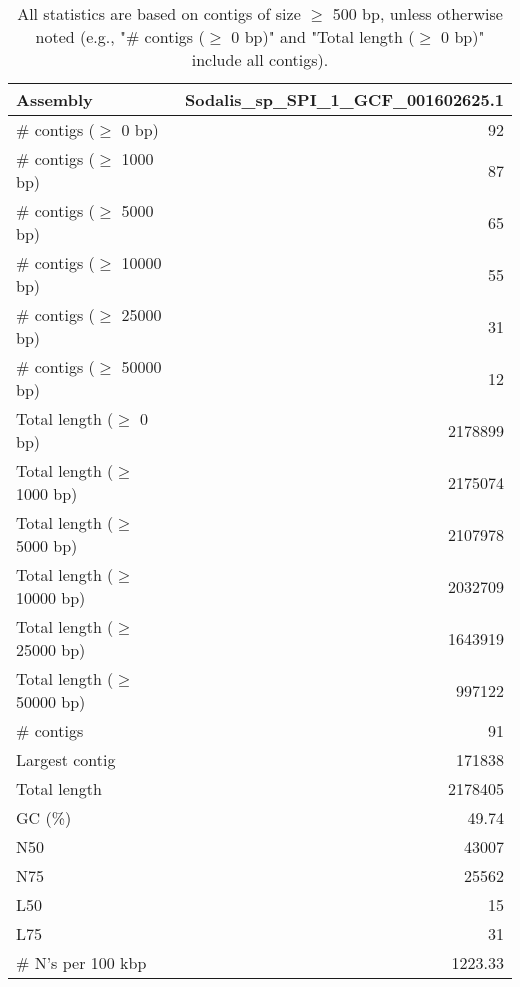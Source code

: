 \documentclass[12pt,a4paper]{article}
\begin{document}
\begin{table}[ht]
\begin{center}
\caption{All statistics are based on contigs of size $\geq$ 500 bp, unless otherwise noted (e.g., "\# contigs ($\geq$ 0 bp)" and "Total length ($\geq$ 0 bp)" include all contigs).}
\begin{tabular}{|l*{1}{|r}|}
\hline
Assembly & Sodalis\_sp\_SPI\_1\_GCF\_001602625.1 \\ \hline
\# contigs ($\geq$ 0 bp) & 92 \\ \hline
\# contigs ($\geq$ 1000 bp) & 87 \\ \hline
\# contigs ($\geq$ 5000 bp) & 65 \\ \hline
\# contigs ($\geq$ 10000 bp) & 55 \\ \hline
\# contigs ($\geq$ 25000 bp) & 31 \\ \hline
\# contigs ($\geq$ 50000 bp) & 12 \\ \hline
Total length ($\geq$ 0 bp) & 2178899 \\ \hline
Total length ($\geq$ 1000 bp) & 2175074 \\ \hline
Total length ($\geq$ 5000 bp) & 2107978 \\ \hline
Total length ($\geq$ 10000 bp) & 2032709 \\ \hline
Total length ($\geq$ 25000 bp) & 1643919 \\ \hline
Total length ($\geq$ 50000 bp) & 997122 \\ \hline
\# contigs & 91 \\ \hline
Largest contig & 171838 \\ \hline
Total length & 2178405 \\ \hline
GC (\%) & 49.74 \\ \hline
N50 & 43007 \\ \hline
N75 & 25562 \\ \hline
L50 & 15 \\ \hline
L75 & 31 \\ \hline
\# N's per 100 kbp & 1223.33 \\ \hline
\end{tabular}
\end{center}
\end{table}
\end{document}
